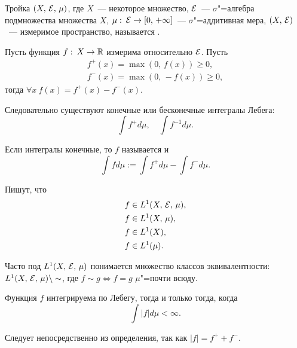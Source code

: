 \newpage
{}

\begin{definition}
    Тройка $(X,\, \mathcal{E},\, \mu)$, где $X$~--- некоторое множество,
    $\mathcal{E}$~--- $\sigma$"=алгебра подмножества множества $X$,
    $\mu:\:\mathcal{E}\to[0,\,+\infty]$~--- $\sigma$"=аддитивная мера,
    $(X,\, \mathcal{E})$~--- измеримое пространство, называется
    .
\end{definition}

\begin{definition}
    Пусть функция $f:\: X\to\mathbb{R}$ измерима относительно $\mathcal{E}$.
    Пусть \begin{align*}
        f^{+}(x)=\max(0,\, f(x))\geqslant 0, \\
        f^{-}(x)=\max(0,\, -f(x))\geqslant 0,
    \end{align*}
    тогда $\forall x\ f(x)=f^+(x)-f^{-}(x)$.

    Следовательно существуют конечные или бесконечные интегралы Лебега:
    \[
        \int f^{+}d\mu,\quad \int f^{-1}d\mu.
    \]

    Если интегралы конечные, то $f$ называется  и \[
        \int fd\mu:=\int f^{+}d\mu-\int f^{-}d\mu.
    \]

    Пишут, что \begin{align*}
        f & \in L^{1}(X,\, \mathcal{E},\, \mu), \\
        f & \in L^{1}(X,\, \mu),        \\
        f & \in L^{1}(X),               \\
        f & \in L^{1}(\mu).
    \end{align*}

    \begin{remark}
        Часто под $L^1(X,\, \mathcal{E},\, \mu)$ понимается множество классов эквивалентности:
        $L^1(X,\, \mathcal{E},\, \mu)\setminus\sim$, где $f\sim g\Leftrightarrow f=g$ $\mu$"=почти всюду.
    \end{remark}
\end{definition}

\begin{remark}
    Функция $f$ интегрируема по Лебегу, тогда и только тогда, когда \[
        \int |f|d\mu<\infty.
    \]

    Следует непосредственно из определения, так как $|f|=f^{+}+f^{-}$.
\end{remark}

